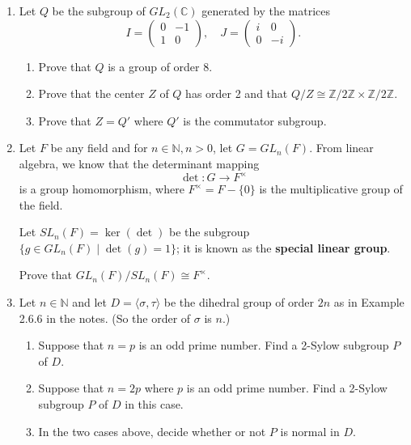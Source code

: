 \documentclass{article}
\begin{document}
\begin{enumerate}
\item Let $ Q $ be the subgroup of $ GL_2(\mathbb{C}) $ generated by the matrices
  $$I = \begin{pmatrix} 0 & -1 \\ 1 & 0 \end{pmatrix}, \quad J = \begin{pmatrix} i & 0 \\ 0 & -i \end{pmatrix}.$$
  \begin{enumerate}
  \item Prove that $ Q $ is a group of order 8.
  \item Prove that the center $ Z $ of $ Q $ has order 2 and that $ Q / Z \cong \mathbb{Z}/2\mathbb{Z} \times \mathbb{Z}/2\mathbb{Z} $.

  \item Prove that $ Z = Q' $ where $ Q' $ is the commutator subgroup.
  \end{enumerate}

\item Let $ F $ be any field and for $ n \in \mathbb{N}, n > 0 $, let $ G = GL_n(F) $.
  From linear algebra, we know that the determinant mapping 
  $$\det: G \to F^\times$$
  is a group homomorphism, where $ F^\times = F - \{0\} $ is the multiplicative group of the field.

  Let $ SL_n(F) = \ker(\det) $ be the subgroup $ \{ g \in GL_n(F) \mid \det(g) = 1 \} $; it is known as the \textbf{special linear group}.

  Prove that $ GL_n(F) / SL_n(F) \cong F^\times $.


\item Let $ n \in \mathbb{N} $ and let $ D = \langle \sigma, \tau \rangle $ be the dihedral group of order $ 2n $ as in Example 2.6.6 in the notes. (So the order of $ \sigma $ is $ n $.)
  \begin{enumerate}
  \item Suppose that $n = p$ is an odd prime number. Find a 2-Sylow subgroup $P$ of $D$.
  \item Suppose that $n = 2p$ where $p$ is an odd prime number. Find a 2-Sylow subgroup $P$ of $D$ in this case. 
  \item In the two cases above, decide whether or not $P$ is normal in $D$.
  \end{enumerate}
\end{enumerate}
\end{document}
